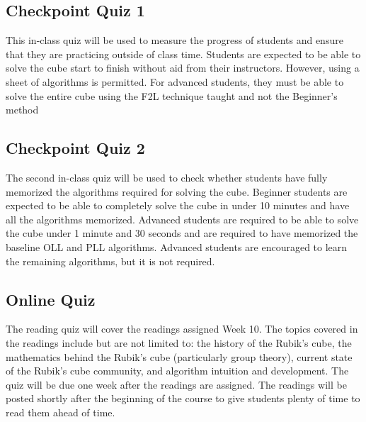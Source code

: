 \documentclass[11pt]{article}
\begin{document}
\subsection*{Checkpoint Quiz 1}
This in-class quiz will be used to measure the progress of students and ensure that they are practicing outside of class time. Students are expected to be able to solve the cube start to finish without aid from their instructors. However, using a sheet of algorithms is permitted. For advanced students, they must be able to solve the entire cube using the F2L technique taught and not the Beginner’s method


\subsection*{Checkpoint Quiz 2}
The second in-class quiz will be used to check whether students have fully memorized the algorithms required for solving the cube. Beginner students are expected to be able to completely solve the cube in under 10 minutes and have all the algorithms memorized. Advanced students are required to be able to solve the cube under 1 minute and 30 seconds and are required to have memorized the baseline OLL and PLL algorithms. Advanced students are encouraged to learn the remaining algorithms, but it is not required.


\subsection*{Online Quiz}

The reading quiz will cover the readings assigned Week 10. The topics covered in the readings include but are not limited to: the history of the Rubik’s cube, the mathematics behind the Rubik’s cube (particularly group theory), current state of the Rubik’s cube community, and algorithm intuition and development. The quiz will be due one week after the readings are assigned. The readings will be posted shortly after the beginning of the course to give students plenty of time to read them ahead of time.
\end{document}
